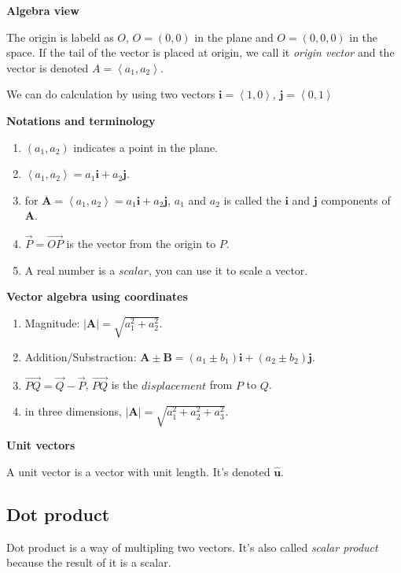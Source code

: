 \documentclass{article}
\newcommand\printvec[1]{\mathbf{#1}}
\newcommand\norm[1]{\mathbf{\left| \printvec{#1} \right|}}
\newcommand\lrangle[1]{\left \langle #1 \right \rangle}
\newcommand\directv{\hat{\mathbf{u}}}
\begin{document}
\textbf{Algebra view}

The origin is labeld as $O$, $O = (0, 0)$ in the plane and $O = (0, 0, 0)$ in the space.
If the tail of the vector is placed at origin, we call it \textit{origin vector} and the vector is denoted $A = \lrangle{a_1, a_2}$.

We can do calculation by using two vectors $\mathbf{i} = \lrangle{1, 0}$, $\mathbf{j} = \lrangle{0, 1}$

\textbf{Notations and terminology}

\begin{enumerate}
  \item $(a_1, a_2)$ indicates a point in the plane.
  \item $\lrangle{a_1, a_2} = a_1\mathbf{i} + a_2\mathbf{j}$.
  \item for $\mathbf{A} = \lrangle{a_1, a_2} = a_1\mathbf{i} + a_2\mathbf{j}$, $a_1$ and $a_2$ is called the $\mathbf{i}$ and $\mathbf{j}$ components of $\mathbf{A}$.
  \item $\overrightarrow{P} = \overrightarrow{OP}$ is the vector from the origin to $P$.
  \item A real number is a $\textit{scalar}$, you can use it to scale a vector.
\end{enumerate}

\textbf{Vector algebra using coordinates}

\begin{enumerate}
  \item Magnitude: $\norm{A} = \sqrt{a_1^2+a_2^2}$.
  \item Addition/Substraction: $\mathbf{A \pm B} = (a_1 \pm b_1)\mathbf{i} + (a_2 \pm b_2)\mathbf{j}$.
  \item $\overrightarrow{PQ} = \overrightarrow{Q} - \overrightarrow{P}$, $\overrightarrow{PQ}$ is the $\textit{displacement}$ from $P$ to $Q$.
  \item in three dimensions, $\norm{A} = \sqrt{a_1^2+a_2^2+a_3^2}$.
\end{enumerate}

\textbf{Unit vectors}

A unit vector is a vector with unit length. It's denoted $\directv$.

\subsection{Dot product}

Dot product is a way of multipling two vectors. It's also called \textit{scalar product} because the result of it is a scalar.
\end{document}
